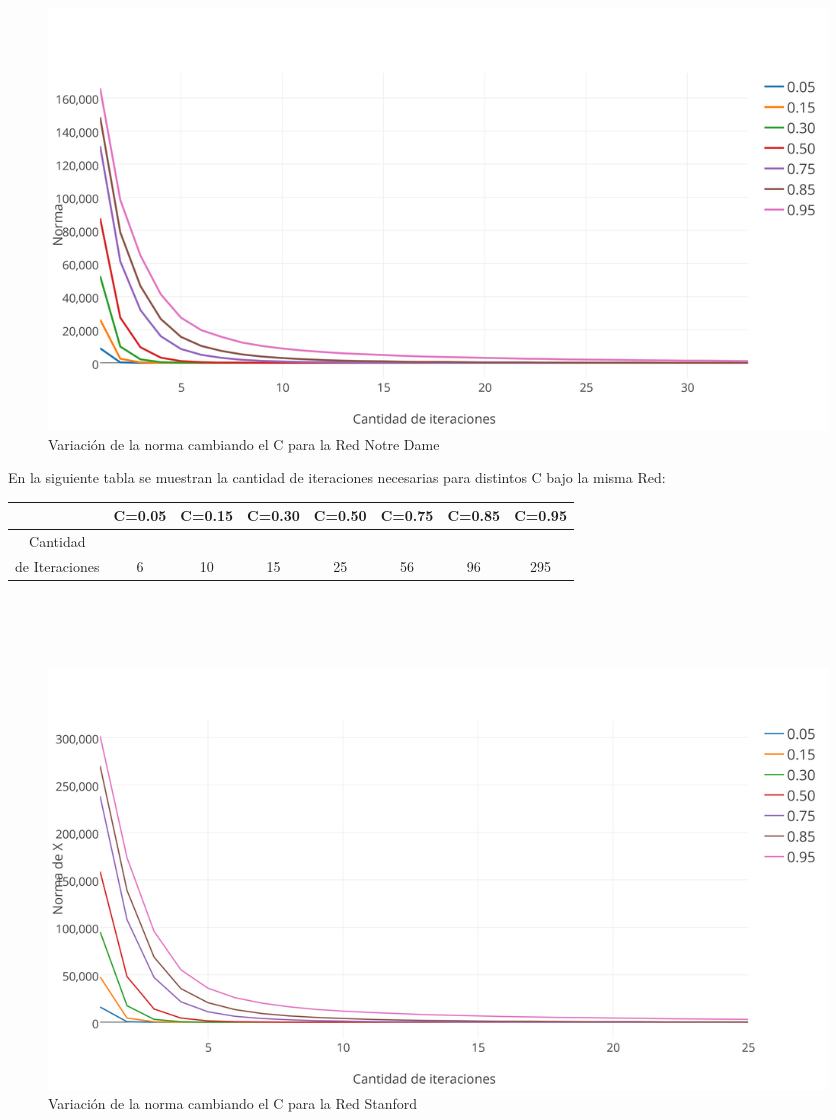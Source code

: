 \documentclass[a4paper]{article}
\begin{document}
\begin{figure}[h!]
  \begin{center}
	\includegraphics[scale=0.50]{imagenes/exp12/notredamePAGERANK.png}
	\caption{Variaci\'on de la norma cambiando el C para la Red Notre Dame}
	\label{nombreparareferenciar}
  \end{center}
\end{figure}
En la siguiente tabla se muestran la cantidad de iteraciones necesarias para distintos C bajo la misma Red: \\
 \begin{tabular}[c]{|c|c|c|c|c|c|c|c|}
\hline
 & C=0.05 & C=0.15 & C=0.30 & C=0.50 & C=0.75 & C=0.85 & C=0.95 \\
\hline
Cantidad &  & & & & & & \\ 
de Iteraciones & 6 & 10 & 15 & 25 & 56 & 96 & 295\\
\hline
	\end{tabular}\\\\
\\

\begin{figure}[h!]
  \begin{center}
	\includegraphics[scale=0.50]{imagenes/exp12/stanfordPAGERANK.png}
	\caption{Variaci\'on de la norma cambiando el C para la Red Stanford}
	\label{nombreparareferenciar}
  \end{center}
\end{figure}
\end{document}
